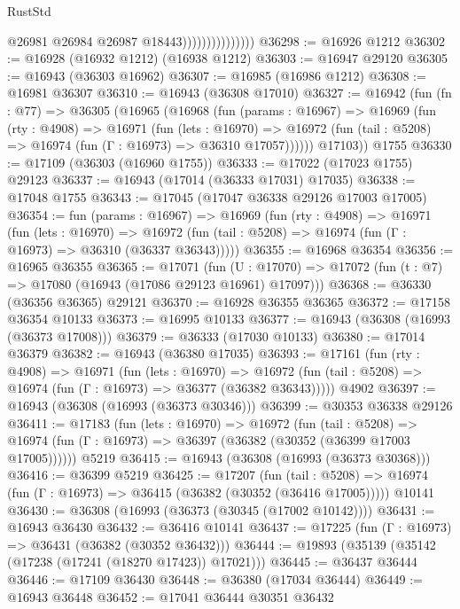 \begin{lexlean}{RustStd}
\begin{coremodule}
                                  @26981
                                  @26984
                                  @26987
                                  @18443)))))))))))))))
@36298 := @16926 @1212
@36302 := @16928 (@16932 @1212) (@16938 @1212)
@36303 := @16947 @29120
@36305 := @16943 (@36303 @16962)
@36307 := @16985 (@16986 @1212)
@36308 := @16981 @36307
@36310 := @16943 (@36308 @17010)
@36327 := @16942
    (fun (fn : @77) =>
    @36305
      (@16965
        (@16968
          (fun (params : @16967) =>
          @16969
            (fun (rty : @4908) =>
            @16971
              (fun (lets : @16970) =>
              @16972 (fun (tail : @5208) => @16974 (fun (Γ : @16973) => @36310 @17057))))))
        @17103))
    @1755
@36330 := @17109 (@36303 (@16960 @1755))
@36333 := @17022 (@17023 @1755) @29123
@36337 := @16943 (@17014 (@36333 @17031) @17035)
@36338 := @17048 @1755
@36343 := @17045 (@17047 @36338 @29126 @17003 @17005)
@36354 := fun (params : @16967) =>
  @16969
    (fun (rty : @4908) =>
    @16971
      (fun (lets : @16970) =>
      @16972 (fun (tail : @5208) => @16974 (fun (Γ : @16973) => @36310 (@36337 @36343)))))
@36355 := @16968 @36354
@36356 := @16965 @36355
@36365 := @17071
    (fun (U : @17070) => @17072 (fun (t : @7) => @17080 (@16943 (@17086 @29123 @16961) @17097)))
@36368 := @36330 (@36356 @36365) @29121
@36370 := @16928 @36355 @36365
@36372 := @17158 @36354 @10133
@36373 := @16995 @10133
@36377 := @16943 (@36308 (@16993 (@36373 @17008)))
@36379 := @36333 (@17030 @10133)
@36380 := @17014 @36379
@36382 := @16943 (@36380 @17035)
@36393 := @17161
    (fun (rty : @4908) =>
    @16971
      (fun (lets : @16970) =>
      @16972 (fun (tail : @5208) => @16974 (fun (Γ : @16973) => @36377 (@36382 @36343)))))
    @4902
@36397 := @16943 (@36308 (@16993 (@36373 @30346)))
@36399 := @30353 @36338 @29126
@36411 := @17183
    (fun (lets : @16970) =>
    @16972
      (fun (tail : @5208) =>
      @16974 (fun (Γ : @16973) => @36397 (@36382 (@30352 (@36399 @17003 @17005))))))
    @5219
@36415 := @16943 (@36308 (@16993 (@36373 @30368)))
@36416 := @36399 @5219
@36425 := @17207
    (fun (tail : @5208) => @16974 (fun (Γ : @16973) => @36415 (@36382 (@30352 (@36416 @17005)))))
    @10141
@36430 := @36308 (@16993 (@36373 (@30345 (@17002 @10142))))
@36431 := @16943 @36430
@36432 := @36416 @10141
@36437 := @17225 (fun (Γ : @16973) => @36431 (@36382 (@30352 @36432)))
@36444 := @19893 (@35139 (@35142 (@17238 (@17241 (@18270 @17423)) @17021)))
@36445 := @36437 @36444
@36446 := @17109 @36430
@36448 := @36380 (@17034 @36444)
@36449 := @16943 @36448
@36452 := @17041 @36444 @30351 @36432

\end{coremodule}
\end{lexlean}
